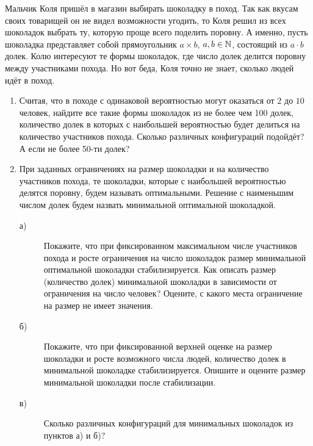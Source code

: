 
Мальчик Коля пришёл в магазин выбирать шоколадку в поход. Так как вкусам своих товарищей он не видел возможности угодить, то Коля решил из всех шоколадок выбрать ту, которую проще всего поделить поровну. А именно, пусть шоколадка представляет собой прямоугольник $a\times b$, $a, b \in \mathbb{N}$, состоящий из $a\cdot b$ долек. Колю интересуют те формы шоколадок, где число долек делится поровну между участниками похода. Но вот беда, Коля точно не знает, сколько людей идёт в поход.
\begin{enumerate}
\item Считая, что в походе с одинаковой вероятностью могут оказаться от $2$ до $10$ человек, найдите все такие формы шоколадок из не более чем 100 долек, количество долек в которых с наибольшей вероятностью будет делиться на количество участников похода. Сколько различных конфигураций подойдёт? А если не более 50-ти долек?
\item При заданных ограничениях на размер шоколадки и на количество участников похода, те шоколадки, которые с наибольшей вероятностью делятся поровну, будем называть оптимальными. Решение с наименьшим числом долек будем назвать минимальной оптимальной шоколадкой.
\begin{description}
\item[а)] Покажите, что при фиксированном максимальном числе участников похода и росте ограничения на число шоколадок размер минимальной оптимальной шоколадки стабилизируется. Как описать размер (количество долек) минимальной шоколадки в зависимости от ограничения на число человек? Оцените, с какого места ограничение на размер не имеет значения.
\item[б)] Покажите, что при фиксированной верхней оценке на размер шоколадки и росте возможного числа людей, количество долек в минимальной шоколадке стабилизируется. Опишите и оцените размер минимальной шоколадки после стабилизации.
\item[в)] Сколько различных конфигураций для минимальных шоколадок из пунктов а) и б)?
\end{description}


\end{enumerate}
